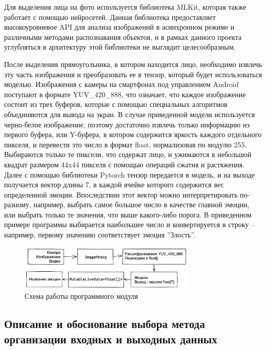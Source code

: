 \documentclass[a4paper,12pt]{article}
\begin{document}
    Для выделения лица на фото используется библиотека MLKit, которая также работает с помощью нейросетей.
    Данная библиотека предоставляет высокоуровневое API для анализа изображений в асинхронном режиме и различными методами распознавания объектов,
    и в рамках данного проекта углубляться в архитектуру этой библиотеки не выглядит целесообразным.

    После выделения прямоугольника, в котором находится лицо, необходимо извлечь эту часть изображения и преобразовать ее в тензор, который будет использоваться моделью.
    Изображения с камеры на смартфонах под управлением Android поступают в формате YUV\_420\_888, что означает, что каждое изображение состоит из трех буферов, которые с помощью специальных алгоритмов объединяются для вывода на экран.
    В случае приведенной модели используется черно-белое изображение, поэтому достаточно извлечь только информацию из первого буфера, или Y-буфера, в котором содержится яркость каждого отдельного пикселя, и перевести это число в формат float, нормализовав по модулю 255.
    Выбираются только те пиксели, что содержат лицо, и ужимаются в небольшой квадрат размером 44x44 пикселя с помощью операций сжатия и растяжения.
    Далее с помощью библиотеки Pytorch тензор передается в модель, и на выходе получается вектор длины 7, в каждой ячейке которого содержится вес определенной эмоции.
    Впоследствии этот вектор можно интерпретировать по-разному, например, выбрать самое большое число в качестве главной эмоции, или выбрать только те значения, что выше какого-либо порога.
    В приведенном примере программы выбирается наибольшее число и конвертируется в строку -- например, первому значению соответствует эмоция ''Злость''.

    \begin{figure}[h]
        \caption{Схема работы программного модуля}
        \centering
        \includegraphics[width=0.75\textwidth]{flow}
    \end{figure}

    \subsection{Описание и обоснование выбора метода организации входных и выходных данных}
\end{document}
